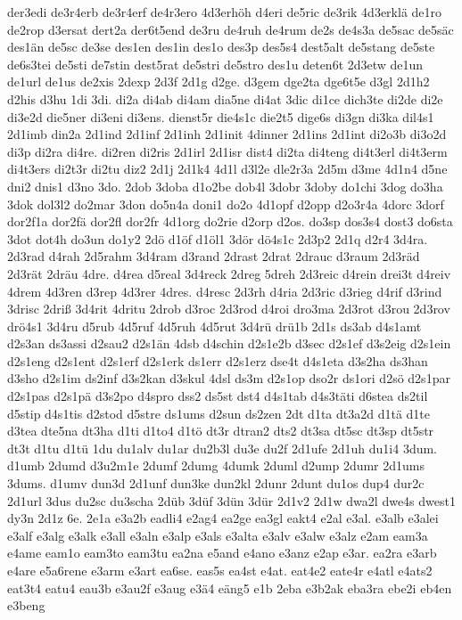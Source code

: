 {der3edi
de3r4erb
de3r4erf
de4r3ero
4d3erhöh
d4eri
de5ric
de3rik
4d3erklä
de1ro
de2rop
d3ersat
dert2a
der6t5end
de3ru
de4ruh
de4rum
de2s
de4s3a
de5sac
de5säc
des1än
de5sc
de3se
des1en
des1in
des1o
des3p
des5s4
dest5alt
de5stang
de5ste
de6s3tei
de5sti
de7stin
dest5rat
de5stri
de5stro
des1u
deten6t
2d3etw
de1un
de1url
de1us
de2xis
2dexp
2d3f
2d1g
d2ge.
d3gem
dge2ta
dge6t5e
d3gl
2d1h2
d2his
d3hu
1di
3di.
di2a
di4ab
di4am
dia5ne
di4at
3dic
di1ce
dich3te
di2de
di2e
di3e2d
die5ner
di3eni
di3ens.
dienst5r
die4s1c
die2t5
dige6s
di3gn
di3ka
dil4s1
2d1imb
din2a
2d1ind
2d1inf
2d1inh
2d1init
4dinner
2d1ins
2d1int
di2o3b
di3o2d
di3p
di2ra
di4re.
di2ren
di2ris
2d1irl
2d1isr
dist4
di2ta
di4teng
di4t3erl
di4t3erm
di4t3ers
di2t3r
di2tu
diz2
2d1j
2d1k4
4d1l
d3l2e
dle2r3a
2d5m
d3me
4d1n4
d5ne
dni2
dnis1
d3no
3do.
2dob
3doba
d1o2be
dob4l
3dobr
3doby
do1chi
3dog
do3ha
3dok
dol3l2
do2mar
3don
do5n4a
doni1
do2o
4d1opf
d2opp
d2o3r4a
4dorc
3dorf
dor2f1a
dor2fä
dor2fl
dor2fr
4d1org
do2rie
d2orp
d2os.
do3sp
dos3s4
dost3
do6sta
3dot
dot4h
do3un
do1y2
2dö
d1öf
d1öl1
3dör
dö4s1c
2d3p2
2d1q
d2r4
3d4ra.
2d3rad
d4rah
2d5rahm
3d4ram
d3rand
2drast
2drat
2drauc
d3raum
2d3räd
2d3rät
2dräu
4dre.
d4rea
d5real
3d4reck
2dreg
5dreh
2d3reic
d4rein
drei3t
d4reiv
4drem
4d3ren
d3rep
4d3rer
4dres.
d4resc
2d3rh
d4ria
2d3ric
d3rieg
d4rif
d3rind
3drisc
2driß
3d4rit
4dritu
2drob
d3roc
2d3rod
d4roi
dro3ma
2d3rot
d3rou
2d3rov
drö4s1
3d4ru
d5rub
4d5ruf
4d5ruh
4d5rut
3d4rü
drü1b
2d1s
ds3ab
d4s1amt
d2s3an
ds3assi
d2sau2
d2s1än
4dsb
d4schin
d2s1e2b
d3sec
d2s1ef
d3s2eig
d2s1ein
d2s1eng
d2s1ent
d2s1erf
d2s1erk
ds1err
d2s1erz
dse4t
d4s1eta
d3s2ha
ds3han
d3sho
d2s1im
ds2inf
d3s2kan
d3skul
4dsl
ds3m
d2s1op
dso2r
ds1ori
d2sö
d2s1par
d2s1pas
d2s1pä
d3s2po
d4spro
dss2
ds5st
dst4
d4s1tab
d4s3täti
d6stea
ds2til
d5stip
d4s1tis
d2stod
d5stre
ds1ums
d2sun
ds2zen
2dt
d1ta
dt3a2d
d1tä
d1te
d3tea
dte5na
dt3ha
d1ti
d1to4
d1tö
dt3r
dtran2
dts2
dt3sa
dt5sc
dt3sp
dt5str
dt3t
d1tu
d1tü
1du
du1alv
du1ar
du2b3l
du3e
du2f
2d1ufe
2d1uh
du1i4
3dum.
d1umb
2dumd
d3u2m1e
2dumf
2dumg
4dumk
2duml
d2ump
2dumr
2d1ums
3dums.
d1umv
dun3d
2d1unf
dun3ke
dun2kl
2dunr
2dunt
du1os
dup4
dur2c
2d1url
3dus
du2sc
du3scha
2düb
3düf
3dün
3dür
2d1v2
2d1w
dwa2l
dwe4s
dwest1
dy3n
2d1z
6e.
2e1a
e3a2b
eadli4
e2ag4
ea2ge
ea3gl
eakt4
e2al
e3al.
e3alb
e3alei
e3alf
e3alg
e3alk
e3all
e3aln
e3alp
e3als
e3alta
e3alv
e3alw
e3alz
e2am
eam3a
e4ame
eam1o
eam3to
eam3tu
ea2na
e5and
e4ano
e3anz
e2ap
e3ar.
ea2ra
e3arb
e4are
e5a6rene
e3arm
e3art
ea6se.
eas5s
ea4st
e4at.
eat4e2
eate4r
e4atl
e4ats2
eat3t4
eatu4
eau3b
e3au2f
e3aug
e3ä4
eäng5
e1b
2eba
e3b2ak
eba3ra
ebe2i
eb4en
e3beng
}
